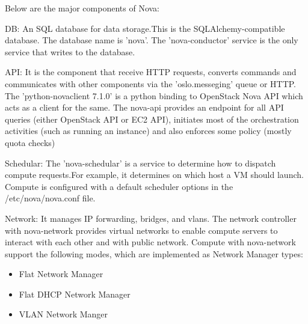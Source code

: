 \documentclass[9pt,twocolumn,twoside]{../../styles/osajnl}
\begin{document}
Below are the major components of Nova:


\begin{flushleft}


DB: An SQL database for data storage.This is the SQLAlchemy-compatible database. The database name is 'nova'. The 'nova-conductor' service is the only service that writes to the database. 
\end{flushleft}

\begin{flushleft}
\item API: It is the component that receive HTTP requests, converts commands and communicates with other components via the 'oslo.messeging' queue or HTTP.
The 'python-novaclient 7.1.0' is a python binding to OpenStack Nova API which acts as a client for the same. The nova-api provides an endpoint for all API queries (either OpenStack API or EC2 API), initiates most of the orchestration activities (such as running an instance) and also enforces some policy (mostly quota checks)
\end{flushleft}

\begin{flushleft}

Schedular: The 'nova-schedular' is a service to determine how to dispatch compute requests.For example, it determines on which host a VM should launch. Compute is configured with a default scheduler options in the /etc/nova/nova.conf file\cite{www-nova-schedular}.
\end{flushleft}


\begin{flushleft}

Network: It manages IP forwarding, bridges, and vlans. The network controller with nova-network provides virtual networks to enable compute servers to interact with each other and with public network. Compute with nova-network support the following modes, which are implemented as Network Manager types:
\begin{itemize}

\item Flat Network Manager

\item Flat DHCP Network Manager

\item VLAN Network Manger

\end{itemize}

\end{flushleft}
\end{document}
